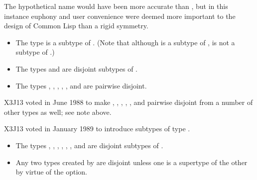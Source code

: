 \beforenoterule
\begin{rationale}
The hypothetical name  would have been more accurate than
, but in this instance euphony and
user convenience were deemed more important to the design
of Common Lisp than a rigid symmetry.
\end{rationale}
\afternoterule

\begin{itemize}
\item
The type  is a subtype of .
(Note that although  is a subtype of ,
 is not a subtype of .)

\item
The types  and  are disjoint subtypes of .

\item
The types , , , ,
, and  are pairwise disjoint.
\end{itemize}

\begin{new}
X3J13 voted in June 1988
to make , , , ,
, and 
pairwise disjoint from a number of other types as well;
see note above.
\end{new}

\begin{new}
X3J13 voted in January 1989
to introduce subtypes of type .

\begin{itemize}
\item
The types , ,
, , , , and
 are disjoint subtypes of .
\end{itemize}
\end{new}

\begin{itemize}
\item
Any two types created by  are disjoint unless
one is a supertype of the other by virtue of
the  option.
\end{itemize}

\else

